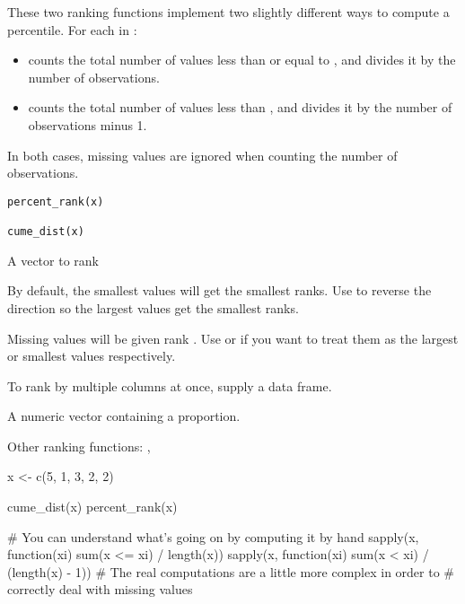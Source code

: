 \documentclass[a4paper]{book}
\begin{document}
%
\begin{Description}
These two ranking functions implement two slightly different ways to
compute a percentile. For each  in :
\begin{itemize}

\item{}  counts the total number of values less than
or equal to , and divides it by the number of observations.
\item{}  counts the total number of values less than
, and divides it by the number of observations minus 1.

\end{itemize}


In both cases, missing values are ignored when counting the number
of observations.
\end{Description}
%
\begin{Usage}
\begin{verbatim}
percent_rank(x)

cume_dist(x)
\end{verbatim}
\end{Usage}
%
\begin{Arguments}
\begin{ldescription}
\item[\code{x}] A vector to rank

By default, the smallest values will get the smallest ranks. Use 
to reverse the direction so the largest values get the smallest ranks.

Missing values will be given rank . Use  or
 if you want to treat them as the largest or smallest
values respectively.

To rank by multiple columns at once, supply a data frame.
\end{ldescription}
\end{Arguments}
%
\begin{Value}
A numeric vector containing a proportion.
\end{Value}
%
\begin{SeeAlso}
Other ranking functions: 
,
\end{SeeAlso}
%
\begin{Examples}
\begin{ExampleCode}
x <- c(5, 1, 3, 2, 2)

cume_dist(x)
percent_rank(x)

# You can understand what's going on by computing it by hand
sapply(x, function(xi) sum(x <= xi) / length(x))
sapply(x, function(xi) sum(x < xi)  / (length(x) - 1))
# The real computations are a little more complex in order to
# correctly deal with missing values
\end{ExampleCode}
\end{Examples}
\end{document}
